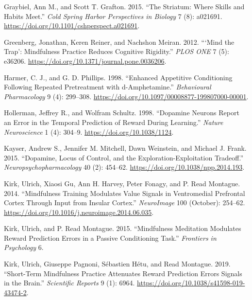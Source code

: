 \documentclass{article}
\newlength{\cslhangindent}
\newlength{\cslentryspacingunit} %
\newenvironment{CSLReferences}[2] %
 {%
  \setlength{\parindent}{0pt}
  \ifodd #1
  \let\oldpar\par
  \def\par{\hangindent=\cslhangindent\oldpar}
  \fi
  \setlength{\parskip}{#2\cslentryspacingunit}
 }%
 {}
\begin{document}
\begin{CSLReferences}{1}{0}
\leavevmode{}%
Graybiel, Ann M., and Scott T. Grafton. 2015. {``The {Striatum}: {Where
Skills} and {Habits Meet}.''} \emph{Cold Spring Harbor Perspectives in
Biology} 7 (8): a021691.
\url{https://doi.org/10.1101/cshperspect.a021691}.

\leavevmode{}%
Greenberg, Jonathan, Keren Reiner, and Nachshon Meiran. 2012.
{``{`{Mind} the {Trap}'}: {Mindfulness Practice Reduces Cognitive
Rigidity}.''} \emph{PLOS ONE} 7 (5): e36206.
\url{https://doi.org/10.1371/journal.pone.0036206}.

\leavevmode{}%
Harmer, C. J., and G. D. Phillips. 1998. {``Enhanced Appetitive
Conditioning Following Repeated Pretreatment with d-Amphetamine.''}
\emph{Behavioural Pharmacology} 9 (4): 299--308.
\url{https://doi.org/10.1097/00008877-199807000-00001}.

\leavevmode{}%
Hollerman, Jeffrey R., and Wolfram Schultz. 1998. {``Dopamine Neurons
Report an Error in the Temporal Prediction of Reward During Learning.''}
\emph{Nature Neuroscience} 1 (4): 304--9.
\url{https://doi.org/10.1038/1124}.

\leavevmode{}%
Kayser, Andrew S., Jennifer M. Mitchell, Dawn Weinstein, and Michael J.
Frank. 2015. {``Dopamine, {Locus} of {Control}, and the
{Exploration-Exploitation Tradeoff}.''} \emph{Neuropsychopharmacology}
40 (2): 454--62. \url{https://doi.org/10.1038/npp.2014.193}.

\leavevmode{}%
Kirk, Ulrich, Xiaosi Gu, Ann H. Harvey, Peter Fonagy, and P. Read
Montague. 2014. {``Mindfulness Training Modulates Value Signals in
Ventromedial Prefrontal Cortex Through Input from Insular Cortex.''}
\emph{NeuroImage} 100 (October): 254--62.
\url{https://doi.org/10.1016/j.neuroimage.2014.06.035}.

\leavevmode{}%
Kirk, Ulrich, and P. Read Montague. 2015. {``Mindfulness Meditation
Modulates Reward Prediction Errors in a Passive Conditioning Task.''}
\emph{Frontiers in Psychology} 6.

\leavevmode{}%
Kirk, Ulrich, Giuseppe Pagnoni, Sébastien Hétu, and Read Montague. 2019.
{``Short-Term Mindfulness Practice Attenuates Reward Prediction Errors
Signals in the Brain.''} \emph{Scientific Reports} 9 (1): 6964.
\url{https://doi.org/10.1038/s41598-019-43474-2}.


\end{CSLReferences}
\end{document}
